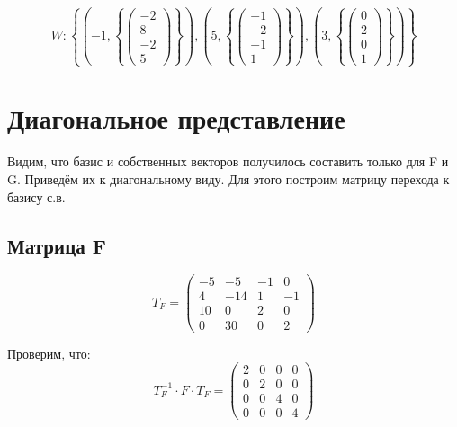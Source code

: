 \documentclass[12pt, a4paper]{article}
\begin{document}
    \begin{equation}
        W: \left\{ 
            \left(-1, \left\{\begin{pmatrix} -2\\8\\-2\\5 \end{pmatrix} \right\} \right),
            \left(5, \left\{\begin{pmatrix} -1\\-2\\-1\\1 \end{pmatrix} \right\} \right),
            \left(3, \left\{\begin{pmatrix} 0\\2\\0\\1 \end{pmatrix} \right\} \right)
        \right\}
    \end{equation}
 
    
    \section{Диагональное представление}

    Видим, что базис и собственных векторов получилось составить только для F и G.
    Приведём их к диагональному виду. Для этого построим матрицу перехода к базису с.в.

    \subsection{Матрица F}

    \begin{equation}
        T_F = \begin{pmatrix}
            -5 & -5 & -1 & 0 \\
            4 & -14 & 1 & -1 \\
            10 & 0 & 2 & 0 \\
            0 & 30 & 0 & 2
        \end{pmatrix}
    \end{equation}
    
    Проверим, что:
    \begin{equation}
        T_F^{-1} \cdot F \cdot T_F = \left(\begin{matrix}
            2 & 0 & 0 & 0 \\
            0 & 2 & 0 & 0 \\
            0 & 0 & 4 & 0 \\
            0 & 0 & 0 & 4
        \end{matrix}\right)
    \end{equation}
\end{document}
